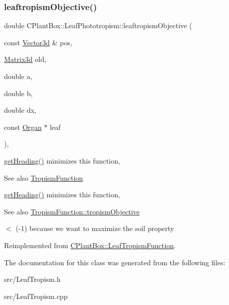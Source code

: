 \subsubsection{\texorpdfstring{leaftropism\+Objective()}{leaftropismObjective()}}
{\footnotesize\ttfamily double C\+Plant\+Box\+::\+Leaf\+Phototropism\+::leaftropism\+Objective (\begin{DoxyParamCaption}\item[{const \hyperlink{classCPlantBox_1_1Vector3d}{Vector3d} \&}]{pos,  }\item[{\hyperlink{classCPlantBox_1_1Matrix3d}{Matrix3d}}]{old,  }\item[{double}]{a,  }\item[{double}]{b,  }\item[{double}]{dx,  }\item[{const \hyperlink{classCPlantBox_1_1Organ}{Organ} $\ast$}]{leaf }\end{DoxyParamCaption})\hspace{0.3cm}{\ttfamily [override]}, {\ttfamily [virtual]}}



\hyperlink{classCPlantBox_1_1LeafTropismFunction_a1440868221a834474e34e3a503a74572}{get\+Heading()} minimizes this function, 

\begin{DoxySeeAlso}{See also}
\hyperlink{classCPlantBox_1_1TropismFunction}{Tropism\+Function}
\end{DoxySeeAlso}
\hyperlink{classCPlantBox_1_1LeafTropismFunction_a1440868221a834474e34e3a503a74572}{get\+Heading()} minimizes this function, \begin{DoxySeeAlso}{See also}
\hyperlink{classCPlantBox_1_1TropismFunction_a4f2c79fff55d1398c98a070dd8ebbe08}{Tropism\+Function\+::tropism\+Objective} 
\end{DoxySeeAlso}
$<$ (-\/1) because we want to maximize the soil property 

Reimplemented from \hyperlink{classCPlantBox_1_1LeafTropismFunction_ab89f5f7e80103d80681bc8cadc220dba}{C\+Plant\+Box\+::\+Leaf\+Tropism\+Function}.



The documentation for this class was generated from the following files\+:\begin{DoxyCompactItemize}
\item 
src/Leaf\+Tropism.\+h\item 
src/Leaf\+Tropism.\+cpp\end{DoxyCompactItemize}
